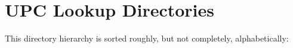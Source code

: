\section{UPC Lookup Directories}
This directory hierarchy is sorted roughly, but not completely, alphabetically:\begin{CompactList}
\item {}
\end{CompactList}

